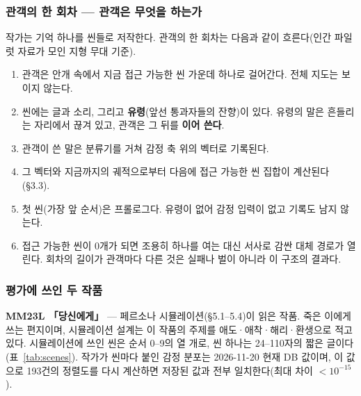 \documentclass[11pt, a4paper]{article}
\begin{document}
\subsubsection*{관객의 한 회차 --- 관객은 무엇을 하는가}

작가는 기억 하나를 씬들로 저작한다. 관객의 한 회차는 다음과 같이 흐른다(인간 파일럿 자료가 모인 지형 무대 기준).
\begin{enumerate}
  \item 관객은 안개 속에서 지금 접근 가능한 씬 가운데 하나로 걸어간다. 전체 지도는 보이지 않는다.
  \item 씬에는 글과 소리, 그리고 \textbf{유령}(앞선 통과자들의 잔향)이 있다. 유령의 말은 흔들리는 자리에서 끊겨 있고, 관객은 그 뒤를 \textbf{이어 쓴다}.
  \item 관객이 쓴 말은 분류기를 거쳐 감정 축 위의 벡터로 기록된다.
  \item 그 벡터와 지금까지의 궤적으로부터 다음에 접근 가능한 씬 집합이 계산된다(\S3.3).
  \item 첫 씬(가장 앞 순서)은 프롤로그다. 유령이 없어 감정 입력이 없고 기록도 남지 않는다.
  \item 접근 가능한 씬이 0개가 되면 조용히 하나를 여는 대신 서사로 감싼 대체 경로가 열린다. 회차의 길이가 관객마다 다른 것은 실패나 벌이 아니라 이 구조의 결과다.
\end{enumerate}

\subsubsection*{평가에 쓰인 두 작품}

\textbf{MM23L 「당신에게」} --- 페르소나 시뮬레이션(\S5.1--5.4)이 읽은 작품. 죽은 이에게 쓰는 편지이며, 시뮬레이션 설계는 이 작품의 주제를 애도·애착·해리·환생으로 적고 있다. 시뮬레이션에 쓰인 씬은 순서 0--9의 열 개로, 씬 하나는 24--110자의 짧은 글이다(표~\ref{tab:scenes}). 작가가 씬마다 붙인 감정 분포는 2026-11-20 현재 DB 값이며, 이 값으로 193건의 정렬도를 다시 계산하면 저장된 값과 전부 일치한다(최대 차이 $<10^{-15}$).
\end{document}
